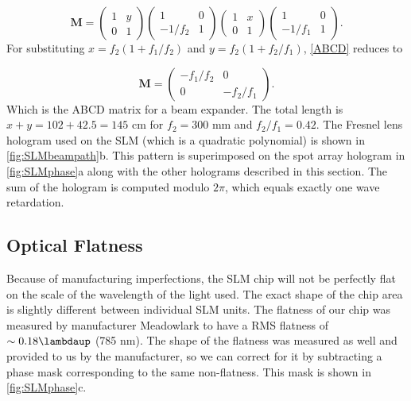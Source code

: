 \begin{equation}\label{ABCD}
	\mathbf{M}=
	\begin{pmatrix}
		1 & y \\
		0 & 1
	\end{pmatrix}
	\begin{pmatrix}
		1 & 0 \\
		-1/f_2 & 1
	\end{pmatrix}
	\begin{pmatrix}
		1 & x \\
		0 & 1
	\end{pmatrix}
	\begin{pmatrix}
		1 & 0 \\
		-1/f_1 & 1
	\end{pmatrix}.
\end{equation}
For substituting $x= f_2(1+f_1/f_2)$ and $y=f_2(1+f_2/f_1)$, \cref{ABCD} reduces to

\begin{equation}
	\mathbf{M}=
	\begin{pmatrix}
		-f_1/f_2 & 0\\
		0 & -f_2/f_1
	\end{pmatrix}.
\end{equation}
Which is the ABCD matrix for a beam expander. The total length is $x+y = 102 + 42.5 = 145$ cm for $f_2 = 300$ mm and $f_2/f_1=0.42$.
The Fresnel lens hologram used on the SLM (which is a quadratic polynomial) is shown in \ref{fig:SLMbeampath}b.
This pattern is superimposed on the spot array hologram in \ref{fig:SLMphase}a along with the other holograms described in this section. 
The sum of the hologram is computed modulo $2\pi$, which equals exactly one wave retardation.



\subsection{Optical Flatness}\label{subsec:Flatness}

Because of manufacturing imperfections, the SLM chip will not be perfectly flat on the scale of the wavelength of the light used. 
The exact shape of the chip area is slightly different between individual SLM units.
The flatness of our chip was measured by manufacturer Meadowlark to have a RMS flatness of $\sim 0.18\lambdaup$ (785 nm).
The shape of the flatness was measured as well and provided to us by the manufacturer, so we can correct for it by subtracting a phase mask corresponding to the same non-flatness.
This mask is shown in \ref{fig:SLMphase}c.


